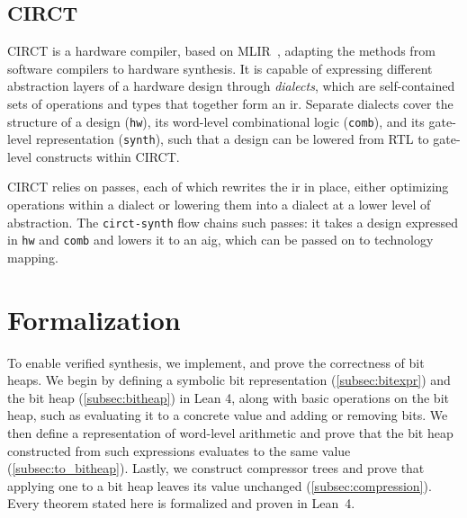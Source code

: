 \documentclass[conference]{IEEEtran}
\theoremstyle{plain}
\theoremstyle{definition}
\begin{document}
\subsection{CIRCT}
\label{sec:circt}
CIRCT is a hardware compiler, based on MLIR~\cite{lattner2021mlir}, adapting the methods from software compilers to hardware synthesis.
It is capable of expressing different abstraction layers of a hardware design through \textit{dialects}, which
are self-contained sets of operations and types that together form an \ac{ir}.
Separate dialects cover the structure of a design (\texttt{hw}), its
word-level combinational logic (\texttt{comb}), and its gate-level representation (\texttt{synth}), such that a design
can be lowered from RTL to gate-level constructs within CIRCT.

CIRCT relies on passes, each of which rewrites the \ac{ir} in place, either optimizing operations within a
dialect or lowering them into a dialect at a lower level of abstraction.
The \texttt{circt-synth} flow chains such passes: it takes a design expressed in \texttt{hw} and \texttt{comb}
and lowers it to an \ac{aig}, which can be passed on to technology mapping.

\section{Formalization}\label{sec:formalization}

To enable verified synthesis, we implement, and prove the correctness of bit heaps.
We begin by defining a symbolic bit representation (\autoref{subsec:bitexpr}) and the bit heap (\autoref{subsec:bitheap}) in Lean 4,
along with basic operations on the bit heap, such as evaluating it to a concrete value and adding or removing bits.
We then define a representation of word-level arithmetic and prove that the bit heap
constructed from such expressions evaluates to the same value (\autoref{subsec:to_bitheap}).
Lastly, we construct compressor trees and prove that applying one to a bit heap leaves its value unchanged (\autoref{subsec:compression}).
Every theorem stated here is formalized and proven in Lean~4.
\end{document}
